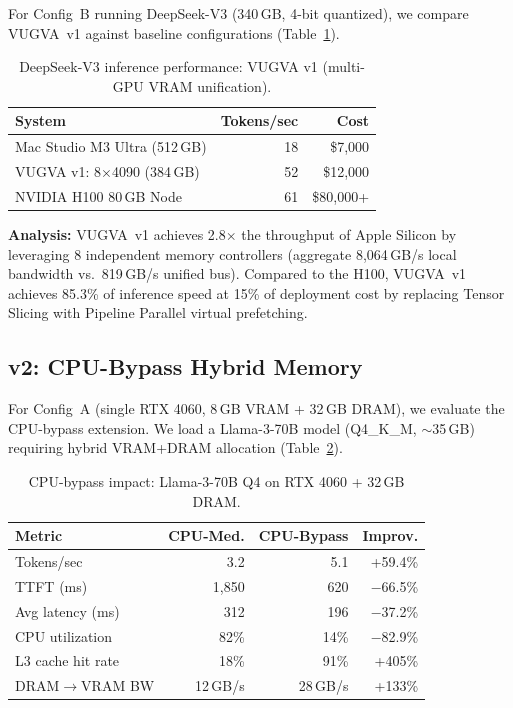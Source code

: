 \documentclass[11pt,twocolumn]{article}
\begin{document}
For Config~B running DeepSeek-V3 (340\,GB, 4-bit quantized), we compare VUGVA~v1 against baseline configurations (Table~\ref{tab:v1_results}).

\begin{table}[ht]
\centering
\caption{DeepSeek-V3 inference performance: VUGVA v1 (multi-GPU VRAM unification).}
\label{tab:v1_results}
\small
\begin{tabular}{lrr}
\toprule
\textbf{System} & \textbf{Tokens/sec} & \textbf{Cost} \\
\midrule
Mac Studio M3 Ultra (512\,GB) & 18 & \$7,000 \\
VUGVA v1: 8$\times$4090 (384\,GB) & 52 & \$12,000 \\
NVIDIA H100 80\,GB Node & 61 & \$80,000+ \\
\bottomrule
\end{tabular}
\end{table}

\textbf{Analysis:} VUGVA~v1 achieves 2.8$\times$ the throughput of Apple Silicon by leveraging 8 independent memory controllers (aggregate 8,064\,GB/s local bandwidth vs.\ 819\,GB/s unified bus). Compared to the H100, VUGVA~v1 achieves 85.3\% of inference speed at 15\% of deployment cost by replacing Tensor Slicing with Pipeline Parallel virtual prefetching.

\subsection{v2: CPU-Bypass Hybrid Memory}

For Config~A (single RTX 4060, 8\,GB VRAM + 32\,GB DRAM), we evaluate the CPU-bypass extension. We load a Llama-3-70B model (Q4\_K\_M, $\sim$35\,GB) requiring hybrid VRAM+DRAM allocation (Table~\ref{tab:v2_results}).

\begin{table}[ht]
\centering
\caption{CPU-bypass impact: Llama-3-70B Q4 on RTX 4060 + 32\,GB DRAM.}
\label{tab:v2_results}
\small
\begin{tabular}{lrrr}
\toprule
\textbf{Metric} & \textbf{CPU-Med.} & \textbf{CPU-Bypass} & \textbf{Improv.} \\
\midrule
Tokens/sec & 3.2 & 5.1 & +59.4\% \\
TTFT (ms) & 1,850 & 620 & $-$66.5\% \\
Avg latency (ms) & 312 & 196 & $-$37.2\% \\
CPU utilization & 82\% & 14\% & $-$82.9\% \\
L3 cache hit rate & 18\% & 91\% & +405\% \\
DRAM$\rightarrow$VRAM BW & 12\,GB/s & 28\,GB/s & +133\% \\
\bottomrule
\end{tabular}
\end{table}
\end{document}
